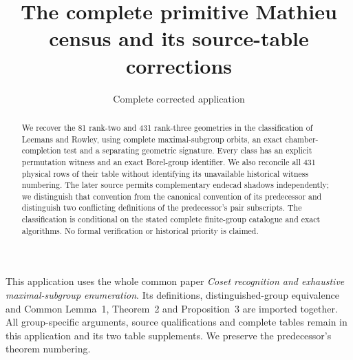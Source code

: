 \documentclass[11pt,a4paper]{article}
\title{The complete primitive Mathieu census and its source-table corrections}
\author{Complete corrected application}
\date{}
\begin{document}
\maketitle
\begin{abstract}
We recover the 81 rank-two and 431 rank-three geometries in the classification of Leemans and Rowley, using complete maximal-subgroup orbits, an exact chamber-completion test and a separating geometric signature. Every class has an explicit permutation witness and an exact Borel-group identifier. We also reconcile all 431 physical rows of their table without identifying its unavailable historical witness numbering. The later source permits complementary endecad shadows independently; we distinguish that convention from the canonical convention of its predecessor and distinguish two conflicting definitions of the predecessor's pair subscripts. The classification is conditional on the stated complete finite-group catalogue and exact algorithms. No formal verification or historical priority is claimed.
\end{abstract}
This application uses the whole common paper \emph{Coset recognition and exhaustive maximal-subgroup enumeration}. Its definitions, distinguished-group equivalence and Common Lemma~1, Theorem~2 and Proposition~3 are imported together. All group-specific arguments, source qualifications and complete tables remain in this application and its two table supplements. We preserve the predecessor's theorem numbering.
\setcounter{theorem}{3}
\setcounter{section}{1}
\end{document}
